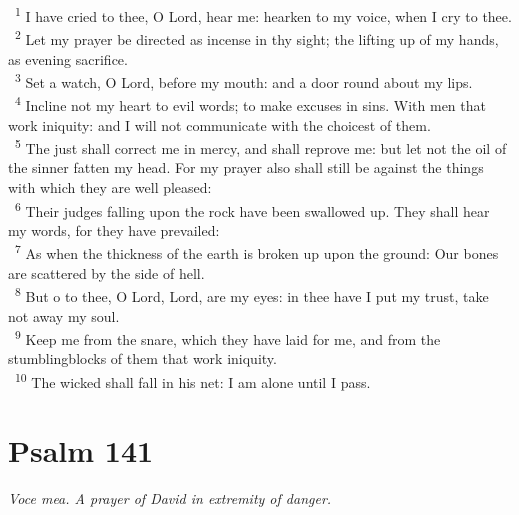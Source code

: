 \documentclass[a5paper,12pt]{article}
\begin{document}
\begin{multicols*}{2}
~\textsuperscript{1} I have cried to thee, O Lord, hear me: hearken to my voice, when I cry to thee.\\
~\textsuperscript{2} Let my prayer be directed as incense in thy sight; the lifting up of my hands, as evening sacrifice.\\
~\textsuperscript{3} Set a watch, O Lord, before my mouth: and a door round about my lips.\\
~\textsuperscript{4} Incline not my heart to evil words; to make excuses in sins. With men that work iniquity: and I will not communicate with the choicest of them.\\
~\textsuperscript{5} The just shall correct me in mercy, and shall reprove me: but let not the oil of the sinner fatten my head. For my prayer also shall still be against the things with which they are well pleased:\\
~\textsuperscript{6} Their judges falling upon the rock have been swallowed up. They shall hear my words, for they have prevailed:\\
~\textsuperscript{7} As when the thickness of the earth is broken up upon the ground: Our bones are scattered by the side of hell.\\
~\textsuperscript{8} But o to thee, O Lord, Lord, are my eyes: in thee have I put my trust, take not away my soul.\\
~\textsuperscript{9} Keep me from the snare, which they have laid for me, and from the stumblingblocks of them that work iniquity.\\
~\textsuperscript{10} The wicked shall fall in his net: I am alone until I pass.\\

\section{Psalm 141}
\label{sec:org0836d3c}
\emph{Voce mea. A prayer of David in extremity of danger.}\\


\end{multicols*}
\end{document}
